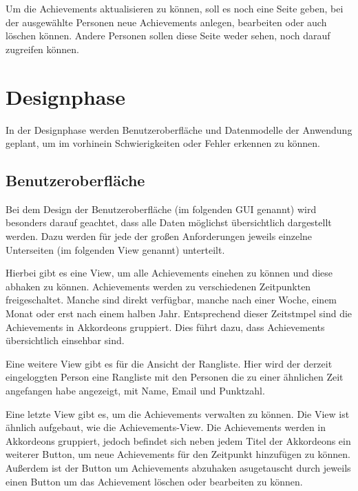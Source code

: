 \documentclass[12pt]{article}
\begin{document}
Um die Achievements aktualisieren zu können, soll es noch eine Seite geben, bei der ausgewählte
Personen neue Achievements anlegen, bearbeiten oder auch löschen können. Andere Personen sollen
diese Seite weder sehen, noch darauf zugreifen können.


%
%

\section{Designphase}
In der Designphase werden Benutzeroberfläche und Datenmodelle der Anwendung geplant, um im
vorhinein Schwierigkeiten oder Fehler erkennen zu können. 

\subsection{Benutzeroberfläche}

Bei dem Design der Benutzeroberfläche (im folgenden GUI genannt) wird
besonders darauf geachtet, dass alle Daten möglichst übersichtlich
dargestellt werden. Dazu werden für jede der großen Anforderungen
jeweils einzelne Unterseiten (im folgenden View genannt) unterteilt. 

Hierbei gibt es eine View, um alle Achievements einehen zu können
und diese abhaken zu können. Achievements werden zu verschiedenen
Zeitpunkten freigeschaltet. Manche sind direkt verfügbar, manche 
nach einer Woche, einem Monat oder erst nach einem halben Jahr. 
Entsprechend dieser Zeitstmpel sind die Achievements in Akkordeons
gruppiert. Dies führt dazu, dass Achievements übersichtlich einsehbar
sind.

Eine weitere View gibt es für die Ansicht der Rangliste. Hier wird
der derzeit eingeloggten Person eine Rangliste mit den Personen die
zu einer ähnlichen Zeit angefangen habe angezeigt, mit Name, Email 
und Punktzahl.

Eine letzte View gibt es, um die Achievements verwalten zu können.
Die View ist ähnlich aufgebaut, wie die Achievements-View. Die Achievements
werden in Akkordeons gruppiert, jedoch befindet sich neben jedem Titel
der Akkordeons ein weiterer Button, um neue Achievements für den Zeitpunkt
hinzufügen zu können. Außerdem ist der Button um Achievements abzuhaken
asugetauscht durch jeweils einen Button um das Achievement löschen oder 
bearbeiten zu können.
\end{document}
